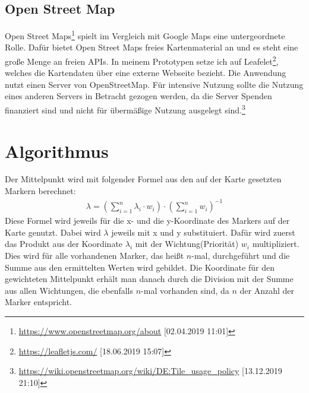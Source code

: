 \documentclass[a4paper, 12pt]{scrreprt}
\begin{document}
\section{Open Street Map}
Open Street Maps\footnote{\url{https://www.openstreetmap.org/about}  [02.04.2019 11:01]} spielt im Vergleich mit Google Maps eine untergeordnete Rolle.
Dafür bietet Open Street Maps freies Kartenmaterial an und es steht eine große Menge an freien APIs.
In meinem Prototypen setze ich auf Leafelet\footnote{\url{https://leafletjs.com/} [18.06.2019 15:07]}, welches die Kartendaten über eine externe Webseite bezieht.
Die Anwendung nutzt einen Server von OpenStreetMap.
Für intensive Nutzung sollte die Nutzung eines anderen Servers in Betracht gezogen werden, da die Server Spenden finanziert sind und nicht für übermäßige Nutzung ausgelegt sind.\footnote{\url{https://wiki.openstreetmap.org/wiki/DE:Tile_usage_policy} [13.12.2019 21:10]}

\chapter{Algorithmus}
Der Mittelpunkt wird mit folgender Formel aus den auf der Karte gesetzten Markern berechnet:
\begin{eqnarray}
\lambda = \left(\sum_{i=1}^{n}\lambda_i \cdot w_i \right) \cdot \left(\sum_{i=1}^{n} w_i \right)^{-1}
\end{eqnarray}
Diese Formel wird jeweils für die x- und die y-Koordinate des Markers auf der Karte genutzt.
Dabei wird $\lambda$ jeweils mit x und y substituiert.
Dafür wird zuerst das Produkt aus der Koordinate $\lambda_i$ mit der Wichtung(Priorität) $w_i$ multipliziert.
Dies wird für alle vorhandenen Marker, das heißt $n$-mal, durchgeführt und die Summe aus den ermittelten Werten wird gebildet.
Die Koordinate für den gewichteten Mittelpunkt erhält man danach durch die Division mit der Summe aus allen Wichtungen, die ebenfalls $n$-mal vorhanden sind, da $n$ der Anzahl der Marker entspricht.
\end{document}
